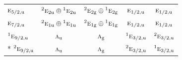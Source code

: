 \documentclass[10pt,a4paper]{article}
\numberwithin{equation}{section}
\newcommand{\irr}[1]{\text{\normalfont\scshape #1}}
\newcommand{\conjpair}[1]{{}^{#1}}
\newcommand{\ptag}[1]{\mathrm{#1}}
\begin{document}
{\begin{longtable}{@{}lcccc@{}}
$\irr{e}_{5/2,\ptag{u}}$ & $\conjpair{2}\irr{e}_{2\ptag{u}}\oplus \conjpair{1}\irr{e}_{2\ptag{u}}$ & $\conjpair{2}\irr{e}_{2\ptag{g}}\oplus \conjpair{1}\irr{e}_{2\ptag{g}}$ & $\irr{e}_{1/2,\ptag{u}}$ & $\irr{e}_{1/2,\ptag{u}}$\\
$\irr{e}_{7/2,\ptag{u}}$ & $\conjpair{2}\irr{e}_{1\ptag{u}}\oplus \conjpair{1}\irr{e}_{1\ptag{u}}$ & $\conjpair{2}\irr{e}_{1\ptag{g}}\oplus \conjpair{1}\irr{e}_{1\ptag{g}}$ & $\irr{e}_{1/2,\ptag{u}}$ & $\irr{e}_{1/2,\ptag{u}}$\\
$\conjpair{1}\irr{e}_{9/2,\ptag{u}}$ & $\irr{a}_{\ptag{u}}$ & $\irr{a}_{\ptag{g}}$ & $\conjpair{1}\irr{e}_{3/2,\ptag{u}}$ & $\conjpair{2}\irr{e}_{3/2,\ptag{u}}$\\*
$\conjpair{2}\irr{e}_{9/2,\ptag{u}}$ & $\irr{a}_{\ptag{u}}$ & $\irr{a}_{\ptag{g}}$ & $\conjpair{2}\irr{e}_{3/2,\ptag{u}}$ & $\conjpair{1}\irr{e}_{3/2,\ptag{u}}$\\
\bottomrule\end{longtable}}
\end{document}
